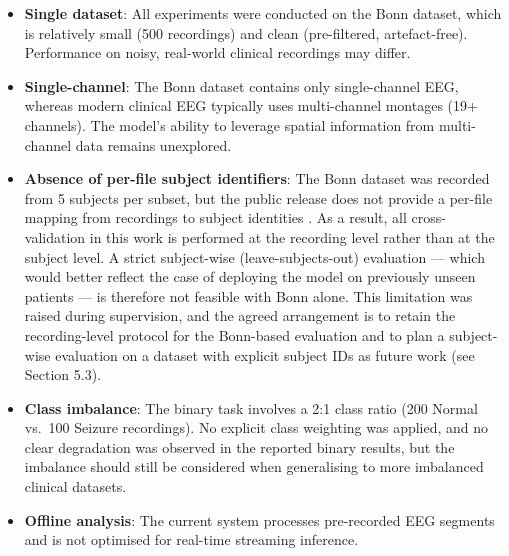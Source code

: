 \begin{itemize}
    \item \textbf{Single dataset}: All experiments were conducted on the Bonn dataset, which is relatively small (500 recordings) and clean (pre-filtered, artefact-free). Performance on noisy, real-world clinical recordings may differ.
    \item \textbf{Single-channel}: The Bonn dataset contains only single-channel EEG, whereas modern clinical EEG typically uses multi-channel montages (19+ channels). The model's ability to leverage spatial information from multi-channel data remains unexplored.
    \item \textbf{Absence of per-file subject identifiers}: The Bonn dataset was recorded from 5 subjects per subset, but the public release does not provide a per-file mapping from recordings to subject identities \cite{andrzejak2001}. As a result, all cross-validation in this work is performed at the recording level rather than at the subject level. A strict subject-wise (leave-subjects-out) evaluation --- which would better reflect the case of deploying the model on previously unseen patients --- is therefore not feasible with Bonn alone. This limitation was raised during supervision, and the agreed arrangement is to retain the recording-level protocol for the Bonn-based evaluation and to plan a subject-wise evaluation on a dataset with explicit subject IDs as future work (see Section 5.3).
    \item \textbf{Class imbalance}: The binary task involves a 2:1 class ratio (200 Normal vs.\ 100 Seizure recordings). No explicit class weighting was applied, and no clear degradation was observed in the reported binary results, but the imbalance should still be considered when generalising to more imbalanced clinical datasets.
    \item \textbf{Offline analysis}: The current system processes pre-recorded EEG segments and is not optimised for real-time streaming inference.
\end{itemize}
